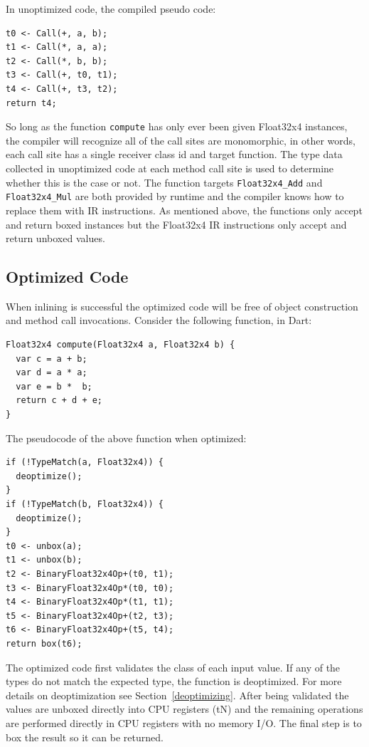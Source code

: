 \documentclass[preprint]{sigplanconf}
\begin{document}
In unoptimized code, the compiled pseudo code:

\begin{verbatim}
t0 <- Call(+, a, b);
t1 <- Call(*, a, a);
t2 <- Call(*, b, b);
t3 <- Call(+, t0, t1);
t4 <- Call(+, t3, t2);
return t4;
\end{verbatim}

So long as the function \verb!compute! has only ever been given Float32x4 instances, the compiler will recognize all of the call sites are monomorphic, in other words, each call site has a single receiver class id and target function. The type data collected in unoptimized code at each method call site is used to determine whether this is the case or not. The function targets \verb!Float32x4_Add! and \verb!Float32x4_Mul! are both provided by runtime and the compiler knows how to replace them with IR instructions. As mentioned above, the functions only accept and return boxed instances but the Float32x4 IR instructions only accept and return unboxed values. 

\subsection{Optimized Code}
When inlining is successful the optimized code will be free of object construction and method call invocations. Consider the following function, in Dart:

\begin{verbatim}
Float32x4 compute(Float32x4 a, Float32x4 b) {
  var c = a + b;
  var d = a * a;
  var e = b *  b;
  return c + d + e;
}
\end{verbatim}

The pseudocode of the above function when optimized:

\begin{verbatim}
if (!TypeMatch(a, Float32x4)) {
  deoptimize();
}
if (!TypeMatch(b, Float32x4)) {
  deoptimize();
}
t0 <- unbox(a);
t1 <- unbox(b);
t2 <- BinaryFloat32x4Op+(t0, t1);
t3 <- BinaryFloat32x4Op*(t0, t0);
t4 <- BinaryFloat32x4Op*(t1, t1);
t5 <- BinaryFloat32x4Op+(t2, t3);
t6 <- BinaryFloat32x4Op+(t5, t4);
return box(t6);
\end{verbatim}

The optimized code first validates the class of each input value. If any of the types do not match the expected type, the function is deoptimized. For more details on deoptimization see Section~\ref{deoptimizing}. After being validated the values are unboxed directly into CPU registers (tN) and the remaining operations are performed directly in CPU registers with no memory I/O. The final step is to box the result so it can be returned.
\end{document}
